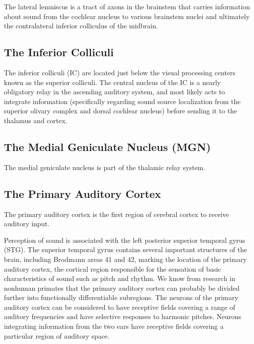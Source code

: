 \documentclass[]{book}
\begin{document}
The lateral lemniscus is a tract of axons in the brainstem that carries information about sound from the cochlear nucleus to various brainstem nuclei and ultimately the contralateral inferior colliculus of the midbrain.

\hypertarget{the-inferior-colliculi}{%
\subsection{The Inferior Colliculi}\label{the-inferior-colliculi}}

The inferior colliculi (IC) are located just below the visual processing centers known as the superior colliculi. The central nucleus of the IC is a nearly obligatory relay in the ascending auditory system, and most likely acts to integrate information (specifically regarding sound source localization from the superior olivary complex and dorsal cochlear nucleus) before sending it to the thalamus and cortex.

\hypertarget{the-medial-geniculate-nucleus-mgn}{%
\subsection{The Medial Geniculate Nucleus (MGN)}\label{the-medial-geniculate-nucleus-mgn}}

The medial geniculate nucleus is part of the thalamic relay system.

\hypertarget{the-primary-auditory-cortex}{%
\subsection{The Primary Auditory Cortex}\label{the-primary-auditory-cortex}}

The primary auditory cortex is the first region of cerebral cortex to receive auditory input.

Perception of sound is associated with the left posterior superior temporal gyrus (STG). The superior temporal gyrus contains several important structures of the brain, including Brodmann areas 41 and 42, marking the location of the primary auditory cortex, the cortical region responsible for the sensation of basic characteristics of sound such as pitch and rhythm. We know from research in nonhuman primates that the primary auditory cortex can probably be divided further into functionally differentiable subregions. The neurons of the primary auditory cortex can be considered to have receptive fields covering a range of auditory frequencies and have selective responses to harmonic pitches. Neurons integrating information from the two ears have receptive fields covering a particular region of auditory space.
\end{document}
